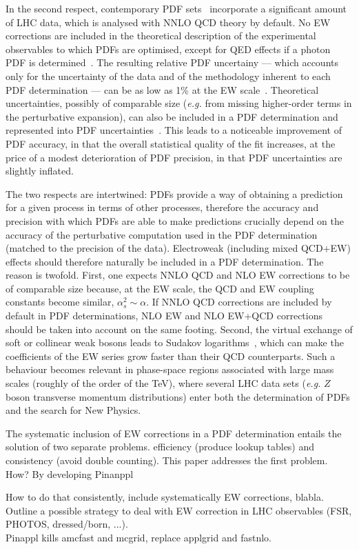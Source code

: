 In the second respect, contemporary PDF
sets~\cite{Harland-Lang:2014zoa,Ball:2017nwa,Hou:2019efy}
incorporate a significant amount of LHC data, which is analysed with NNLO QCD 
theory by default. No EW corrections are included in the theoretical 
description of the experimental observables to which PDFs are optimised,
except for QED effects if a photon PDF is 
determined~\cite{Schmidt:2015zda,Bertone:2017bme,Harland-Lang:2019pla}. 
The resulting relative PDF uncertainy --- 
which accounts only for the uncertainty of the data and of the 
methodology inherent to each PDF determination --- can be as low as 1\% at the 
EW scale~\cite{Ball:2017nwa}. Theoretical uncertainties, possibly of comparable 
size ({\it e.g.} from missing higher-order terms in the perturbative expansion),
can also be included in a PDF determination and represented into PDF 
uncertainties~\cite{AbdulKhalek:2019bux,AbdulKhalek:2019ihb}.
This leads to a noticeable improvement of PDF accuracy, in that the overall 
statistical quality of the fit increases, at the price of a modest 
deterioration of PDF precision, in that PDF uncertainties are slightly inflated.

The two respects are intertwined: PDFs provide a way of obtaining a prediction
for a given process in terms of other processes, therefore the accuracy and 
precision with which PDFs are able to make predictions crucially depend on 
the accuracy of the perturbative computation used in the PDF determination
(matched to the precision of the data). Electroweak (including mixed QCD+EW) 
effects should therefore naturally be included in a PDF determination. The 
reason is twofold. First, one expects NNLO QCD and NLO EW corrections to be of 
comparable size because, at the EW scale, the QCD and EW coupling constants 
become similar, $\alpha_s^2\sim \alpha$. If NNLO QCD corrections are included 
by default in PDF determinations, NLO EW and NLO EW+QCD corrections should be 
taken into account on the same footing. Second, the virtual exchange of soft or 
collinear weak bosons leads to Sudakov 
logarithms~\cite{Denner:2000jv,Denner:2001gw},
which can make the coefficients of the EW series grow faster than 
their QCD counterparts. Such a behaviour becomes relevant in
phase-space regions associated with large mass scales (roughly of the order
of the TeV), where several LHC data sets ({\it e.g.} $Z$ boson transverse 
momentum distributions) enter both the determination of PDFs and the search
for New Physics.

The systematic inclusion of EW corrections in a PDF determination entails
the solution of two separate problems. efficiency (produce lookup tables)
and consistency (avoid double counting).
This paper addresses the first problem. How? By developing Pinanppl

How to do that consistently, include systematically EW corrections, blabla.\\
Outline a possible strategy to deal with EW correction in LHC observables (FSR, PHOTOS, dressed/born, ...).\\
Pinappl kills amcfast and mcgrid, replace applgrid and fastnlo.\\
